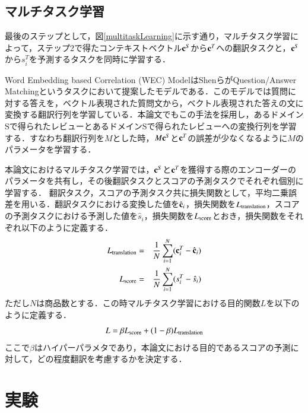 \documentclass[dvipdfmx,twocolumn,10.5pt]{jsarticle}
\begin{document}
\subsection{マルチタスク学習}\label{suggestion_create}
最後のステップとして，図\ref{multitaskLearning}に示す通り，マルチタスク学習によって，ステップ2で得たコンテキストベクトル${\bf c}^S$から$ {\bf c}^T$への翻訳タスクと，${\bf c}^S$から$s^T_i$を予測するタスクを同時に学習する．

Word Embedding based Correlation (WEC) Model\cite{shen2017word}はShenらがQuestion/Answer Matchingというタスクにおいて提案したモデルである．このモデルでは質問に対する答えを，ベクトル表現された質問文から，ベクトル表現された答えの文に変換する翻訳行列を学習している．本論文でもこの手法を採用し，あるドメインSで得られたレビューとあるドメインSで得られたレビューへの変換行列を学習する．すなわち翻訳行列を$M$とした時，$ M{\bf c}^S$と$ {\bf c}^T$の誤差が少なくなるように$M$のパラメータを学習する．
 
本論文におけるマルチタスク学習では，${\bf c}^S$と$ {\bf c}^T$を獲得する際のエンコーダーのパラメータを共有し，その後翻訳タスクとスコアの予測タスクでそれぞれ個別に学習する．
翻訳タスク，スコアの予測タスク共に損失関数として，平均二乗誤差を用いる．翻訳タスクにおける変換した値を$\hat{\bf c}_i$，損失関数を$L_{\rm translation} $，スコアの予測タスクにおける予測した値を$\hat{s}_i$，損失関数を$L_{\rm score}$とおき，損失関数をそれぞれ以下のように定義する．
\begin{eqnarray}
 L_{\rm translation} &=& \frac{1}{N} \sum_{i=1}^N({\bf c}_i^T - \hat{\bf c}_i) \\
 L_{\rm score} &=& \frac{1}{N} \sum_{i=1}^N({s}_i^T - \hat{s}_i)
\end{eqnarray}
ただし$N$は商品数とする．この時マルチタスク学習における目的関数$L$を以下のように定義する．
\begin{equation}
  L = \beta L_{\rm score} +  (1-\beta) L_{\rm translation}
\end{equation}
ここで$\beta$はハイパーパラメタであり，本論文における目的であるスコアの予測に対して，どの程度翻訳を考慮するかを決定する．

\section{実験}\label{experiment}
\end{document}
